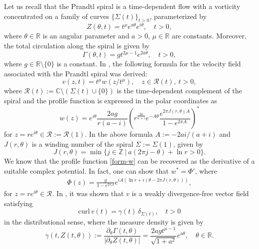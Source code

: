 \documentclass[11pt, letterpaper, reqno]{amsart}
\numberwithin{equation}{section}
\theoremstyle{definition}
\theoremstyle{plain}
\numberwithin{equation}{section}
\def\R{\mathbb{R}}
\def\C{\mathbb{C}}
\def\RR{\mathcal{R}}
\renewcommand{\r}{\mathbb{R}}
\newcommand{\z}{\mathbb{Z}}
\begin{document}
Let us recall that the Prandtl spiral is a time-dependent flow with a vorticity concentrated on a family of curves $\{\Sigma(t)\}_{t>0}$, parameterized by
\begin{equation}\label{spirala}
Z(\theta,t) =t^\mu e^{a\theta}e^{i\theta}, \quad t>0,
\end{equation}
where $\theta\in\R$ is an angular parameter and $a>0$, $\mu\in\R$ are constants. Moreover, the total circulation along the spiral is given by
\begin{equation*}
\Gamma(\theta, t)=gt^{2\mu-1}e^{2a\theta}, \quad t>0,
\end{equation*}
where $g\in\r\setminus\{0\}$ is a constant. In \cite[eq. (1.12)]{CKO}, the following formula for the velocity field associated with the Prandtl spiral was derived:
\begin{equation}\label{predkosc}
v(z,t)=t^\mu w(z/t^\mu), \quad z\in \RR(t), \ t>0,
\end{equation}
where $\RR(t):=\C\setminus(\Sigma(t)\cup\{0\})$ is the time-dependent complement of the spiral and the profile function is expressed in the polar coordinates as 
\begin{equation}\label{form-w}
w(z)=e^{i\theta}\frac{2ag}{r(a-i)}\left(r^{\frac{2a}{a+i}}e^{-A\theta}\frac{e^{2\pi J(r,\theta)A}}{1-e^{2\pi A}}\right)^*
\end{equation} 
for $z=re^{i\theta}\in \RR:=\RR(1)$. In the above formula $A:=-2ai/(a+i)$ and $J(r,\theta)$ is a winding number of the spiral $\Sigma:=\Sigma(1)$, given by 
\begin{equation}\label{def-j}
J(r,\theta)=\min \{j\in \z \ | \ a(2\pi j-\theta)+\ln r >0\}.
\end{equation}
We know that the profile function \eqref{form-w} can be recovered as the derivative of a suitable complex potential. In fact, one can show that $w^{*} = \Phi'$, where 
\begin{align}\label{eq-phi}
\Phi(z) = \frac{g}{1-e^{2\pi A}}e^{iA(\ln r + i(\theta - 2\pi J(r,\theta)))}, 
\end{align}
for $z=re^{i\theta}\in\RR$. In \cite[Theorem 1.8]{CKO}, it was shown that $v$ is a weakly divergence-free vector field satisfying
\begin{equation}\label{eq-omega-1} 
\mathrm{curl}\,v (t) = \gamma(t)\, \delta_{\Sigma(t)}, \quad t>0
\end{equation}
in the distributional sense, where the measure density is given by
\begin{equation}\label{gestosc2bb}
\gamma(t,Z(t,\theta)):=\frac{\partial_\theta \Gamma(t,\theta)}{|\partial_\theta Z(t,\theta)|} =
\frac{2ag t^{\mu-1}}{\sqrt{1+a^{2}}} e^{a\theta}, \quad \theta\in\R.
\end{equation}
\end{document}
